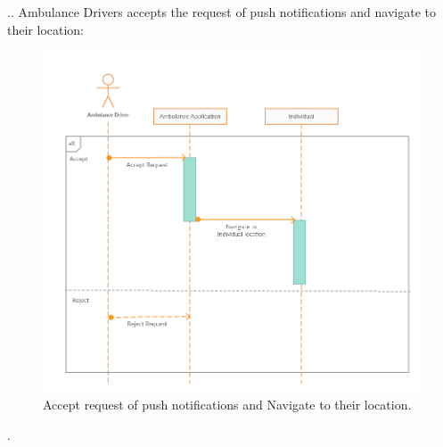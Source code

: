 .\newline\newline\newline\newline\newline\newline\newline\newline\newline\newline\newline\newline{}. Ambulance Drivers accepts the request of push notifications and navigate to their location:
\begin{figure}[H]
	\begin{center}
		\includegraphics[width=\textwidth]{./Sequence/5_AmbulanceDriver.png}
      	\caption{Accept request of push notifications and Navigate to their location.}
        \label{TrackMe_seq5}
	\end{center}
\end{figure}
.\newline\newline\newline\newline\newline\newline\newline\newline\newline
